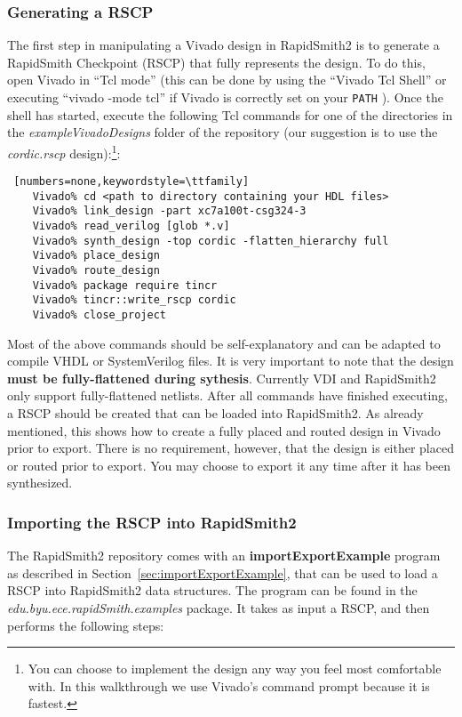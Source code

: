 \subsubsection{Generating a RSCP}  
The first step in manipulating a Vivado design in RapidSmith2 is to generate a
RapidSmith Checkpoint (RSCP) that fully represents the design. To do this, open
Vivado in ``Tcl mode'' (this can be done by using the ``Vivado Tcl Shell'' or
executing ``vivado -mode tcl'' if Vivado is correctly set on your \texttt{PATH}
). Once the shell has started, execute the following Tcl commands
for one of the directories in the \textit{exampleVivadoDesigns}
folder of the repository (our suggestion is to use the
\textit{cordic.rscp} design):\footnote{You can choose to implement the design
any way you feel most comfortable with. In this walkthrough we use Vivado's
command prompt because it is fastest.}:
                
\begin{lstlisting} [numbers=none,keywordstyle=\ttfamily]
	Vivado% cd <path to directory containing your HDL files>
	Vivado% link_design -part xc7a100t-csg324-3
	Vivado% read_verilog [glob *.v]
	Vivado% synth_design -top cordic -flatten_hierarchy full 
	Vivado% place_design
	Vivado% route_design
	Vivado% package require tincr
	Vivado% tincr::write_rscp cordic
	Vivado% close_project
\end{lstlisting}
Most of the above commands should be self-explanatory and can be adapted to
compile VHDL or SystemVerilog files.
It is very important to note that the design \textbf{must be fully-flattened
during sythesis}. Currently VDI and RapidSmith2 only support fully-flattened
netlists. After all commands have finished executing, a RSCP should be created
that can be loaded into RapidSmith2. As already mentioned, this shows how to
create a fully placed and routed design in Vivado prior to export.  There is no
requirement, however, that the design is either placed or routed prior to
export. You may choose to export it any time after it has been synthesized.

\subsubsection{Importing the RSCP into RapidSmith2}
The RapidSmith2 repository comes with an \textbf{importExportExample} program as
described in Section~\ref{sec:importExportExample}, that can be used to load a RSCP
into RapidSmith2 data structures. The program can be found in the
\textit{edu.byu.ece.rapidSmith.exa\-mples} package. It takes as input a RSCP,
and then performs the following steps:

